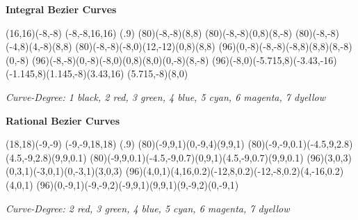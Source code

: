 



\begin{center}
{\Huge \bf{Integral Bezier Curves}}
\bigskip

\begin{lapdf}(16,16)(-8,-8)
 \Dgray
 \Rect(-8,-8,16,16) \Gfill(.9)
 \Black
 \Curve(80)(-8,-8)(8,8) \Stroke
 \Red
 \Curve(80)(-8,-8)(0,8)(8,-8) \Stroke
 \Green
 \Curve(80)(-8,-8)(-4,8)(4,-8)(8,8) \Stroke
 \Blue
 \Curve(80)(-8,-8)(-8,0)(12,-12)(0,8)(8,8) \Stroke
 \Cyan
 \Curve(96)(0,-8)(-8,-8)(-8,8)(8,8)(8,-8)(0,-8) \Stroke
 \Magenta
 \Curve(96)(-8,-8)(0,-8)(-8,0)(0,8)(8,0)(0,-8)(8,-8) \Stroke
 \Yellow
 \Curve(96)(-8,0)(-5.715,8)(-3.43,-16)(-1.145,8)(1.145,-8)(3.43,16)
  (5.715,-8)(8,0) \Stroke
\end{lapdf}

\em{Curve-Degree: 1 black, 2 red, 3 green, 4 blue, 5 cyan, 6 magenta, 7 dyellow}
\end{center}

\newpage
{}

\begin{center}
{\Huge \bf{Rational Bezier Curves}}
\bigskip

\begin{lapdf}(18,18)(-9,-9)
 \Dgray
 \Rect(-9,-9,18,18) \Gfill(.9)
 \Red
 \Rcurve(80)(-9,9,1)(0,-9,4)(9,9,1) \Stroke
 \Green
 \Rcurve(80)(-9,-9,0.1)(-4.5,9,2.8)(4.5,-9,2.8)(9,9,0.1) \Stroke
 \Blue
 \Rcurve(80)(-9,9,0.1)(-4.5,-9,0.7)(0,9,1)(4.5,-9,0.7)(9,9,0.1) \Stroke
 \Cyan
 \Rcurve(96)(3,0,3)(0,3,1)(-3,0,1)(0,-3,1)(3,0,3) \Stroke
 \Magenta
 \Rcurve(96)(4,0,1)(4,16,0.2)(-12,8,0.2)(-12,-8,0.2)(4,-16,0.2)(4,0,1)
  \Stroke
 \Yellow
 \Rcurve(96)(0,-9,1)(-9,-9,2)(-9,9,1)(9,9,1)(9,-9,2)(0,-9,1) \Stroke
\end{lapdf}

\em{Curve-Degree: 2 red, 3 green, 4 blue, 5 cyan, 6 magenta, 7 dyellow}
\end{center}

